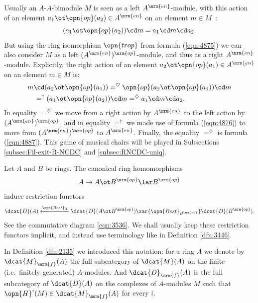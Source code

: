Usually an $A$-$A$-bimodule $M$ is seen as a left 
$A^{\mrm{en}}$-module, with this action of an element 
$a_1 \ot \opn{op}(a_2) \in A^{\mrm{en}}$ on an element $m \in M$~:
\begin{equation} \label{eqn:4887}
(a_1 \ot \opn{op}(a_2)) \cd m = 
a_1 \cd m \cd a_2 .
\end{equation}
But using the ring isomorphism $\opn{trop}$ from formula (\ref{eqn:4875}) we 
can also consider $M$ as a left $(A^{\mrm{en}})^{\mrm{op}}$-module, and thus as 
a right $A^{\mrm{en}}$-module. Explicitly, the right action of an element 
$a_2 \ot \opn{op}(a_1) \in A^{\mrm{en}}$ on an element $m \in M$ is:
\begin{equation} \label{eqn:4878}
\begin{aligned}
&
m \cd (a_2 \ot \opn{op}(a_1)) =^{\heartsuit}
\opn{op}(a_2 \ot \opn{op}(a_1)) \cd m
\\ & \quad 
=^{\dag} (a_1 \ot \opn{op}(a_2)) \cd m =^{\diamondsuit} a_1 \cd m \cd a_2 . 
\end{aligned}
\end{equation}
In equality $=^{\heartsuit}$ we move from a right action by $A^{\mrm{en}}$
to the left action by $(A^{\mrm{en}})^{\mrm{op}}$, and in 
equality $=^{\dag}$ we made use of formula (\ref{eqn:4876})
to move from $(A^{\mrm{en}})^{\mrm{op}}$ to $A^{\mrm{en}}$.
Finally, the equality $=^{\diamondsuit}$ is formula (\ref{eqn:4887}). 
This game of musical chairs will be played in Subsections 
\ref{subsec:Fil-exit-R-NCDC} and \ref{subsec:RNCDC-uniq}.

Let $A$ and $B$ be rings. The canonical ring homomorphisms 
\[ A \to A \ot B^{\mrm{op}} \lar B^{\mrm{op}} \]
induce restriction functors 
\begin{equation} \label{eqn:3680}
\dcat{D}(A) \xleftarrow{\opn{Rest}_A} \dcat{D}(A \ot B^{\mrm{op}}) 
\xar{\opn{Rest}_{B^{\mrm{op}}}} \dcat{D}(B^{\mrm{op}}) . 
\end{equation}
See the commutative diagram \ref{eqn:3536}. We shall usually keep 
these restriction functors implicit, and instead use terminology like in 
Definition \ref{dfn:3446}.

In Definition \ref{dfn:2135} we introduced this notation: for a ring $A$ 
we denote by $\dcat{M}_{\mrm{f}}(A)$ the full subcategory of 
$\dcat{M}(A)$ on the finite (i.e.\ finitely generated) $A$-modules.
And $\dcat{D}_{\mrm{f}}(A)$ is the full subcategory of 
$\dcat{D}(A)$ on the complexes of $A$-modules $M$ such that 
$\opn{H}^i(M) \in \dcat{M}_{\mrm{f}}(A)$ for every $i$. 

